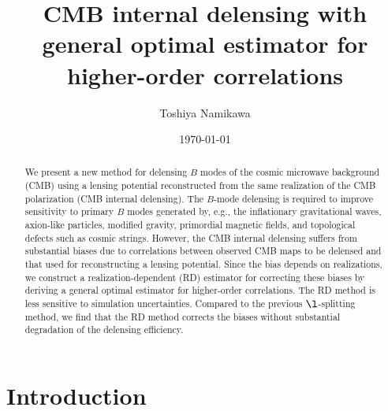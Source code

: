 \documentclass[aps,prd,twocolumn,superscriptaddress,groupedaddress,nofootinbib]{revtex4}
\begin{document}
\title{CMB internal delensing with general optimal estimator for higher-order correlations}

\author{Toshiya Namikawa}

\date{\today}

\begin{abstract}
We present a new method for delensing $B$ modes of the cosmic microwave background (CMB) using 
a lensing potential reconstructed from the same realization of the CMB polarization (CMB internal delensing).
The $B$-mode delensing is required to improve sensitivity to primary $B$ modes generated by, e.g., 
the inflationary gravitational waves, axion-like particles, modified gravity, primordial magnetic fields, 
and topological defects such as cosmic strings. However, the CMB internal delensing suffers from 
substantial biases due to correlations between observed CMB maps to be delensed and that used for 
reconstructing a lensing potential. 
Since the bias depends on realizations, we construct a realization-dependent (RD) estimator for correcting 
these biases by deriving a general optimal estimator for higher-order correlations. 
The RD method is less sensitive to simulation uncertainties. Compared to the previous $\l$-splitting method, 
we find that the RD method corrects the biases without substantial degradation of the delensing efficiency. 
\end{abstract}

\maketitle


\section{Introduction} \label{intro}
\end{document}
